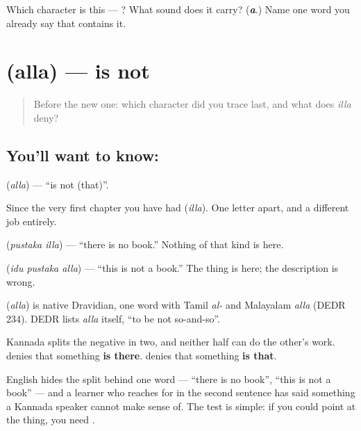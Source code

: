 \begin{tcolorbox}[breakable,colback=teal!4,colframe=teal!35!black,title={Before you move on}]
Which character is this — ? What sound does it carry? (\emph{\textbf{a}}.) Name one word you already say that contains it.
\end{tcolorbox}
\section[\texorpdfstring{\kn{ಅಲ್ಲ} (alla)}{ಅಲ್ಲ (alla)}]{ (alla) — is not}

\label{lesson:KA-C68-is-not}



\begin{quote}
Before the new one: which character did you trace last, and what does \emph{illa} deny?
\end{quote}

\subsection*{You'll want to know: }
\textbf{} (\emph{alla}) — \textquotedblleft{}is not (that)\textquotedblright{}.

Since the very first chapter you have had  (\emph{illa}). One letter apart, and a different job entirely.

\textbf{ } (\emph{pustaka illa}) — \textquotedblleft{}there is no book.\textquotedblright{} Nothing of that kind is here.

\textbf{  } (\emph{idu pustaka alla}) — \textquotedblleft{}this is not a book.\textquotedblright{} The thing is here; the description is wrong.

\begin{cousinweb}
\textbf{} (\emph{alla}) is native Dravidian, one word with Tamil \emph{al-} and Malayalam \emph{alla} (DEDR 234). DEDR lists \emph{alla} itself, \textquotedblleft{}to be not so-and-so\textquotedblright{}.
\end{cousinweb}

\begin{grammarlens}[title={Grammar Lens: two negatives, and which one to reach for}]
Kannada splits the negative in two, and neither half can do the other's work.  denies that something \textbf{is there}.  denies that something \textbf{is that}.

English hides the split behind one word — \textquotedblleft{}there is no book\textquotedblright{}, \textquotedblleft{}this is not a book\textquotedblright{} — and a learner who reaches for  in the second sentence has said something a Kannada speaker cannot make sense of. The test is simple: if you could point at the thing, you need .
\end{grammarlens}

